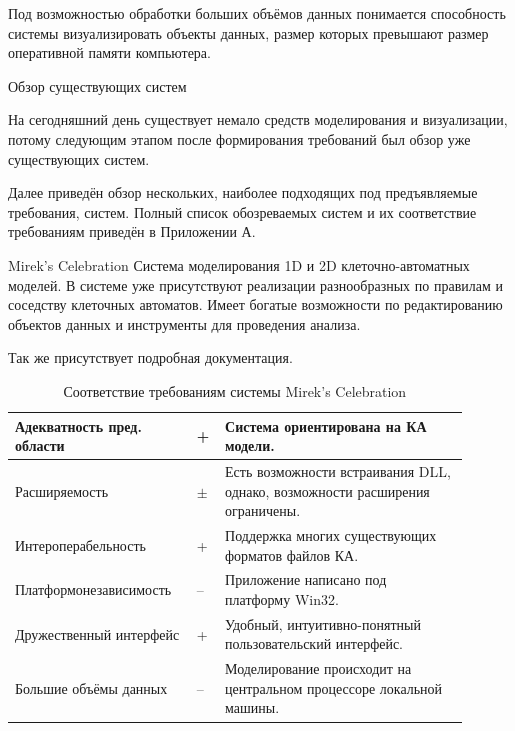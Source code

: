 \documentclass[a4paper,12pt]{extarticle}
\begin{document}
Под возможностью обработки больших объёмов данных понимается способность системы визуализировать объекты данных, размер которых превышают размер оперативной памяти компьютера.


\begin{section}{Обзор существующих систем}

На сегодняшний день существует немало средств моделирования и визуализации, потому следующим этапом после формирования требований был обзор уже существующих систем.

Далее приведён обзор нескольких, наиболее подходящих под предъявляемые требования, систем. Полный список обозреваемых систем и их соответствие требованиям приведён в Приложении А. 

\begin{subsection}{Mirek's Celebration}
    Система моделирования 1D и 2D клеточно-автоматных моделей. В системе уже присутствуют реализации разнообразных по правилам и соседству клеточных автоматов. Имеет богатые возможности по редактированию объектов данных и инструменты для проведения анализа.
    
    Так же присутствует подробная документация.

    \begin{table}[h]
        \caption{Соответствие требованиям системы Mirek's Celebration}
        \label{tabular:mirekscell}
        \begin{center}
            \begin{tabular}{|p{0.35\linewidth}|p{0.05\linewidth}|p{0.5\linewidth}|} \hline
                Адекватность пред. области & + & Система ориентирована на КА модели. \\ \hline
                Расширяемость              & $\pm$ & Есть возможности встраивания DLL, однако, возможности расширения ограничены. \\ \hline
                Интероперабельность        & + & Поддержка многих существующих форматов файлов КА.\\ \hline
                Платформонезависимость     & -- & Приложение написано под платформу Win32. \\ \hline
                Дружественный интерфейс    & + & Удобный, интуитивно-понятный пользовательский интерфейс. \\ \hline
                Большие объёмы данных      & -- & Моделирование происходит на центральном процессоре локальной машины. \\ \hline
            \end{tabular}
        \end{center}
    \end{table}
\end{subsection}


\end{section}
\end{document}
